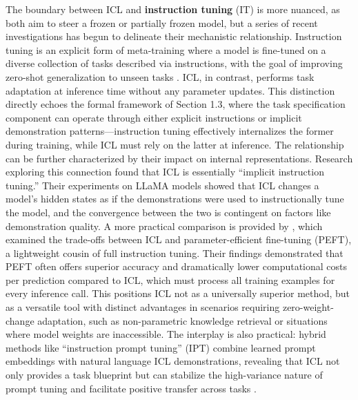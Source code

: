 \documentclass[11pt]{article}
\begin{document}
The boundary between ICL and \textbf{instruction tuning} (IT) is more nuanced, as both aim to steer a frozen or partially frozen model, but a series of recent investigations has begun to delineate their mechanistic relationship. Instruction tuning is an explicit form of meta-training where a model is fine-tuned on a diverse collection of tasks described via instructions, with the goal of improving zero-shot generalization to unseen tasks \cite{ref28}. ICL, in contrast, performs task adaptation at inference time without any parameter updates. This distinction directly echoes the formal framework of Section 1.3, where the task specification component can operate through either explicit instructions or implicit demonstration patterns---instruction tuning effectively internalizes the former during training, while ICL must rely on the latter at inference. The relationship can be further characterized by their impact on internal representations. Research exploring this connection \cite{ref9} found that ICL is essentially ``implicit instruction tuning.'' Their experiments on LLaMA models showed that ICL changes a model's hidden states as if the demonstrations were used to instructionally tune the model, and the convergence between the two is contingent on factors like demonstration quality. A more practical comparison is provided by \cite{ref30}, which examined the trade-offs between ICL and parameter-efficient fine-tuning (PEFT), a lightweight cousin of full instruction tuning. Their findings demonstrated that PEFT often offers superior accuracy and dramatically lower computational costs per prediction compared to ICL, which must process all training examples for every inference call. This positions ICL not as a universally superior method, but as a versatile tool with distinct advantages in scenarios requiring zero-weight-change adaptation, such as non-parametric knowledge retrieval or situations where model weights are inaccessible. The interplay is also practical: hybrid methods like ``instruction prompt tuning'' (IPT) combine learned prompt embeddings with natural language ICL demonstrations, revealing that ICL not only provides a task blueprint but can stabilize the high-variance nature of prompt tuning and facilitate positive transfer across tasks \cite{ref31}.
\end{document}
